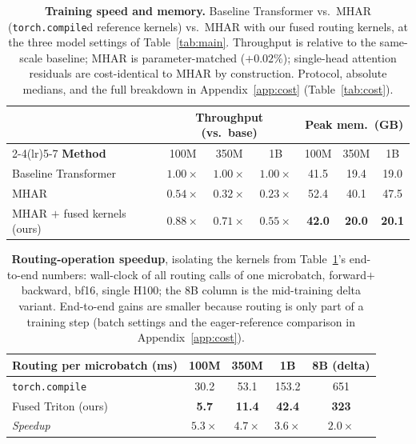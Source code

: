\documentclass{article}
\begin{document}
\begin{table}[t]
\centering
\caption{\textbf{Training speed and memory.} Baseline Transformer vs.\ MHAR
(\texttt{torch.compile}d reference kernels) vs.\ MHAR with our fused routing
kernels, at the three model settings of Table~\ref{tab:main}. Throughput is
relative to the same-scale baseline; MHAR is parameter-matched ($+0.02\%$);
single-head attention residuals are cost-identical to MHAR by construction.
Protocol, absolute medians, and the full breakdown in
Appendix~\ref{app:cost} (Table~\ref{tab:cost}).}
\label{tab:maincost}
\begin{tabular}{lcccccc}
\toprule
& \multicolumn{3}{c}{\textbf{Throughput} (vs.\ base)} & \multicolumn{3}{c}{\textbf{Peak mem.}\ (GB)} \\
\cmidrule(lr){2-4}\cmidrule(lr){5-7}
\textbf{Method} & 100M & 350M & 1B & 100M & 350M & 1B \\
\midrule
Baseline Transformer & $1.00\times$ & $1.00\times$ & $1.00\times$ & 41.5 & 19.4 & 19.0 \\
MHAR & $0.54\times$ & $0.32\times$ & $0.23\times$ & 52.4 & 40.1 & 47.5 \\
MHAR $+$ fused kernels (ours) & $\mathbf{0.88\times}$ & $\mathbf{0.71\times}$ & $\mathbf{0.55\times}$ & \textbf{42.0} & \textbf{20.0} & \textbf{20.1} \\
\bottomrule
\end{tabular}
\end{table}

\begin{table}[t]
\centering
\caption{\textbf{Routing-operation speedup}, isolating the kernels from
Table~\ref{tab:maincost}'s end-to-end numbers: wall-clock of all routing calls
of one microbatch, forward$+$backward, bf16, single H100; the 8B column is the
mid-training delta variant. End-to-end gains are smaller because routing is
only part of a training step (batch settings and the eager-reference
comparison in Appendix~\ref{app:cost}).}
\label{tab:kernelspeed}
\begin{tabular}{lcccc}
\toprule
\textbf{Routing per microbatch (ms)} & \textbf{100M} & \textbf{350M} & \textbf{1B} & \textbf{8B (delta)} \\
\midrule
\texttt{torch.compile}   & 30.2 & 53.1 & 153.2 & 651 \\
Fused Triton (ours)       & \textbf{5.7} & \textbf{11.4} & \textbf{42.4} & \textbf{323} \\
\midrule
\emph{Speedup}           & $5.3\times$ & $4.7\times$ & $3.6\times$ & $2.0\times$ \\
\bottomrule
\end{tabular}
\end{table}
\end{document}
